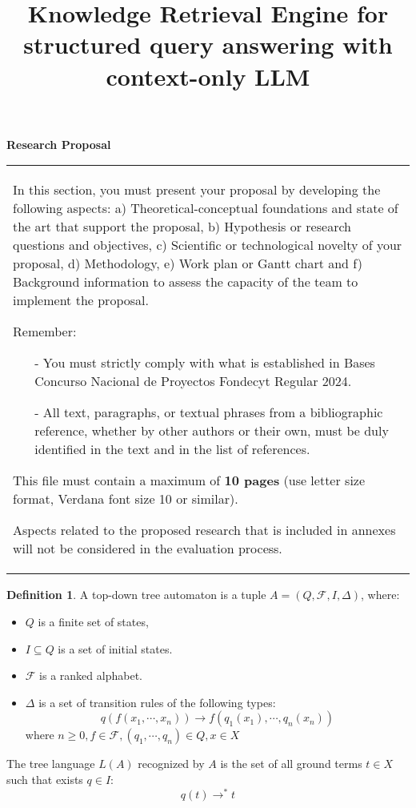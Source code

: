 \documentclass[10pt]{article}
\title{Knowledge Retrieval Engine for structured query answering with context-only LLM}
\theoremstyle{definition}
\newtheorem{definition}{Definition}
\begin{document}
\noindent
\textbf{Research Proposal} \\

{\raggedright

\vspace{3pt} \noindent
\begin{tabular}{|p{\textwidth}|}
\hline
\parbox{\textwidth} {\raggedright  \vspace{3pt}
In this section, you must present your proposal by developing the following aspects: a) Theoretical-conceptual foundations and state of the art that support the proposal, b) Hypothesis or research questions and objectives, c) Scientific or technological novelty of your proposal, d) Methodology, e) Work plan or Gantt chart and f) Background information to assess the capacity of the team to implement the proposal.

\vspace{2mm}

Remember:
\begin{itemize}
\item[-] You must strictly comply with what is established in Bases Concurso Nacional de Proyectos Fondecyt Regular 2024.
\item[-] All text, paragraphs, or textual phrases from a bibliographic reference, whether by other authors or their own, must be duly identified in the text and in the list of references.
\end{itemize}

This file must contain a maximum of {\bf 10 pages} (use letter size format, Verdana font size 10 or similar).

\vspace{2mm}

Aspects related to the proposed research that is included in annexes will not be considered in the evaluation process.}\\
\hline
\end{tabular}
\vspace{2pt}

}

\maketitle


\begin{definition}
A top-down tree automaton is a tuple $A = (Q, \mathcal{F}, I, \Delta)$, where:
\begin{itemize}
  \item $Q$ is a finite set of states,
  \item $I \subseteq Q$ is a set of initial states.
  \item $\mathcal{F}$ is a ranked alphabet.
  \item $\Delta$ is a set of transition rules of the following types:
  $$q(f(x_1,\cdots,x_n)) \rightarrow f(q_1(x_1),\cdots,q_n(x_n))$$
  where $n \geq 0, f \in \mathcal{F}, (q_1,\cdots,q_n) \in Q, x \in X$
\end{itemize}
The tree language $L(A)$ recognized by $A$ is the set of all ground terms $t \in X$ such that exists $q \in I$:
$$q(t) \rightarrow^* t$$
\end{definition}
\end{document}
